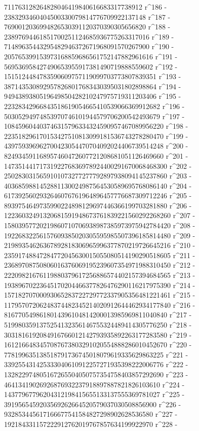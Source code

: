        711763128264828046419840616683317738912 r^186 - 
       2383293460404500330079814776709922137148 r^187 - 
       7690012036994826530391120370390305656820 r^188 - 
       23897694461851700251124685936775263317016 r^189 - 
       71489635443295482946372671968091570267900 r^190 - 
       205765399153973168859686561752147882961616 r^191 - 
       569536958427490653955917381490719888559602 r^192 - 
       1515124484783590609757119099703773807839351 r^193 - 
       3871435308929578268017683430395031802898864 r^194 - 
       9494389380519649850428210247975719311203406 r^195 - 
       22328342966843518619054665410539066369912682 r^196 - 
       50305294974853970746101944579706200542493679 r^197 - 
       108459604403746315796334324590957467089956220 r^198 - 
       223518296170153427510813099181536743278280470 r^199 - 
       439759396962700423054470704092024406739514248 r^200 - 
       824934591168957460472607721208681051126469660 r^201 - 
       1473514417173192276836978924400291670068468300 r^202 - 
       2502830315659101073277277792897938094145237860 r^203 - 
       4036859881452881130024987564530589695768086140 r^204 - 
       6173925602932646076761964896457776687309712246 r^205 - 
       8939754649735990224898129697446366199703281880 r^206 - 
       12236032491320681591948673761839221560292268260 r^207 - 
       15803957720219860710706938987385973975942784420 r^208 - 
       19226832256157609385020305595985507396185814480 r^209 - 
       21989354626367892818306965996377870219726645216 r^210 - 
       23591748847284772045630015055080514190290518605 r^211 - 
       23689708750806016376069195239607354971988310450 r^212 - 
       22209821676119880379617256886574402157394684565 r^213 - 
       19389670223645170204466377826476290116217975390 r^214 - 
       15718270700093065283722729772337905356481221461 r^215 - 
       11795707206248374482345214020912644462934177840 r^216 - 
       8167705498618014396104814200013985969811040840 r^217 - 
       5199803591375254132356146755324489414305776250 r^218 - 
       3031816192084916766012142793935892263177283580 r^219 - 
       1612166483457087673803291020554888286010452670 r^220 - 
       778199635138518791736745018079619335629863225 r^221 - 
       339255431425333040610912257271935398222006776 r^222 - 
       132822974805167265504050757354758403857292690 r^223 - 
       46413419026926876932237918897887821826103610 r^224 - 
       14377967796204312198415655133137555369781027 r^225 - 
       3919565459203569262664520579037030508856900 r^226 - 
       932853445617166677541584827298902628536580 r^227 - 
       192184331157222912762019767857634199922970 r^228 - 
